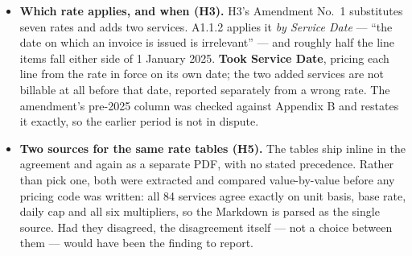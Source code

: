 \documentclass[10pt,a4paper]{article}
\begin{document}
\begin{itemize}
billing the same service twice for the same patient and date --- verified by searching its full text for every
wording the other three use. The other contracts all zero a later duplicate. \textbf{Took the absence at face
value:} repeats are priced normally and not flagged, since flagging them would invent a term this provider
never agreed to. Both absences are asserted in code so a revision cannot reintroduce them silently.
\item \textbf{Which rate applies, and when (H3).} H3's Amendment No.\ 1 substitutes seven rates and adds two
services. A1.1.2 applies it \emph{by Service Date} --- ``the date on which an invoice is issued is irrelevant''
--- and roughly half the line items fall either side of 1 January 2025. \textbf{Took Service Date}, pricing each
line from the rate in force on its own date; the two added services are not billable at all before that date,
reported separately from a wrong rate. The amendment's pre-2025 column was checked against Appendix B and
restates it exactly, so the earlier period is not in dispute.
\item \textbf{Two sources for the same rate tables (H5).} The tables ship inline in the agreement and again as
a separate PDF, with no stated precedence. Rather than pick one, both were extracted and compared
value-by-value before any pricing code was written: all 84 services agree exactly on unit basis, base rate,
daily cap and all six multipliers, so the Markdown is parsed as the single source. Had they disagreed, the
disagreement itself --- not a choice between them --- would have been the finding to report.
\end{itemize}

\vspace{-3pt}
\end{document}
